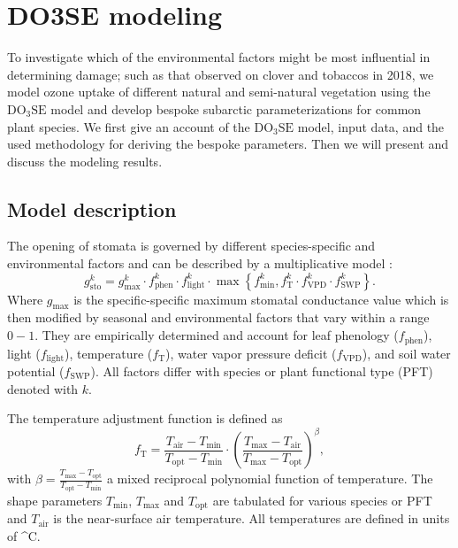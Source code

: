 \documentclass[bg, manuscript]{copernicus}
\begin{document}
\section{DO3SE modeling}
\label{sec:do3se}
To investigate which of the environmental factors might be most influential in determining  damage; such as that observed on clover and tobaccos in 2018, we model ozone uptake of different natural and semi-natural vegetation using the $\mathrm{DO_3SE}$ model and develop bespoke subarctic parameterizations for common plant species. We first give an account of the $\mathrm{DO_3SE}$ model, input data, and the used methodology for deriving the bespoke parameters. Then we will present and discuss the modeling results.

\subsection{Model description}
\label{subsec:model_describtion}
The opening of stomata is governed by different species-specific and environmental factors and can be described by a multiplicative model \citep{PTRS:Jarvis1976,Emberson2000,ICP:MappingManual2017}:
\begin{equation}
  g^k_\text{sto} = g^k_\text{max} \cdot f^k_\text{phen} \cdot f^k_\text{light} \cdot \max{\left\{f^k_\text{min}, f^k_\mathrm{T} \cdot f^k_\mathrm{VPD} \cdot f^k_\text{SWP}\right\}}.
  \label{eq:stomatal}
\end{equation}
%
Where $g_\mathrm{max}$ is the specific-specific maximum stomatal conductance value which is then modified by seasonal and environmental factors that vary within a range $0-1$. They are empirically determined and account for leaf phenology ($f_\text{phen}$), light ($f_\text{light}$), temperature ($f_\mathrm{T}$), water vapor pressure deficit ($f_\mathrm{VPD}$), and soil water potential ($f_\text{SWP}$). All factors differ with species or plant functional type (PFT) denoted with $k$.

The temperature adjustment function is defined as
%
\begin{equation}
  f_\mathrm{T} = \frac{T_\text{air}-T_\text{min}}{T_\text{opt}-T_\text{min}} \cdot \left(\frac{T_{\text{max}}-T_\text{air}}{T_{\text{max}}-T_\text{opt}}\right)^\beta,
  \label{eq:f_temp}
\end{equation}
with $\beta = \frac{T_\text{max}-T_\text{opt}}{T_\text{opt}-T_\text{min}}$ a mixed reciprocal polynomial function of temperature. The shape parameters $T_\text{min}$, $T_\text{max}$ and $T_\text{opt}$ are tabulated for various species or PFT and $T_\mathrm{air}$ is the near-surface air temperature. All temperatures are defined in units of \unit{^\circ C}.
\end{document}
